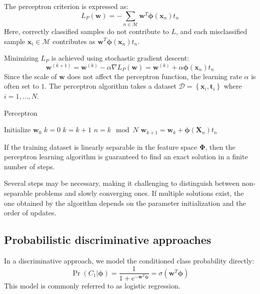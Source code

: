 The perceptron criterion is expressed as:
\[L_P(\textbf{w})=-\sum_{n \in \mathcal{M}}\textbf{w}^T\boldsymbol{\phi}(\textbf{x}_n)t_n\]
Here, correctly classified samples do not contribute to $L$, and each misclassified sample $\textbf{x}_i \in \mathcal{M}$ contributes as $\textbf{w}^T\boldsymbol{\phi}(\textbf{x}_n)t_n$. 

Minimizing $L_P$ is achieved using stochastic gradient descent:
\[\textbf{w}^{(k+1)}=\textbf{w}^{(k)}-\alpha\nabla L_P(\textbf{w})=\textbf{w}^{(k)}+\alpha\boldsymbol{\phi}(\textbf{x}_n)t_n\]
Since the scale of $\textbf{w}$ does not affect the perceptron function, the learning rate $\alpha$ is often set to $1$. 
The perceptron algorithm takes a dataset $\mathcal{D}=\left\{ \textbf{x}_i,\textbf{t}_i  \right\}$ where $i=1,\dots,N$. 
\begin{algorithm}[H]
    \caption{Perceptron}
        \begin{algorithmic}[1]
            \State Initialize $\textbf{w}_0$
            \State $k = 0$
            \Repeat
                \State $k = k+1$
                \State $n = k \mod N$
                    \State $\textbf{w}_{k+1} = \textbf{w}_k + \boldsymbol{\phi}(\textbf{X}_n)t_n$
                \EndIf
        \end{algorithmic}
\end{algorithm}
\begin{theorem}
    If the training dataset is linearly separable in the feature space $\boldsymbol{\Phi}$, then the perceptron learning algorithm is guaranteed to find an exact solution in a finite number of steps.
\end{theorem}
Several steps may be necessary, making it challenging to distinguish between non-separable problems and slowly converging ones. 
If multiple solutions exist, the one obtained by the algorithm depends on the parameter initialization and the order of updates.










\subsection{Probabilistic discriminative approaches}
In a discriminative approach, we model the conditioned class probability directly:
\[\Pr(C_1|\boldsymbol{\phi})=\dfrac{1}{1+e^{-\textbf{w}^T\boldsymbol{\phi}}}=\sigma(\textbf{w}^T\boldsymbol{\phi})\]
This model is commonly referred to as logistic regression.

